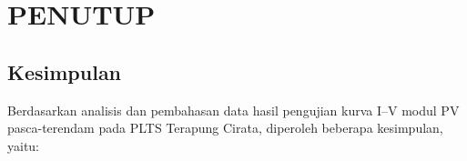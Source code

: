 
\chapter[PENUTUP]{\\ PENUTUP}

\section{Kesimpulan}

Berdasarkan analisis dan pembahasan data hasil pengujian kurva I--V modul PV
pasca-terendam pada PLTS Terapung Cirata, diperoleh beberapa kesimpulan, yaitu:

